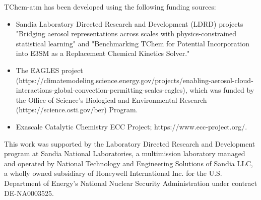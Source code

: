 TChem-atm has been developed using the following funding sources:

\begin{itemize}

\item Sandia Laboratory Directed Research and Development (LDRD) projects "Bridging aerosol representations across scales with physics-constrained statistical learning" and "Benchmarking TChem for Potential Incorporation into E3SM as a Replacement Chemical Kinetics Solver."

\item The EAGLES project (https://climatemodeling.science.energy.gov/projects/enabling-aerosol-cloud-interactions-global-convection-permitting-scales-eagles), which was funded by
the Office of Science's Biological and Environmental
Research (https://science.osti.gov/ber) Program.

\item Exascale Catalytic Chemistry ECC Project; https://www.ecc-project.org/.

\end{itemize}


This work was supported by the Laboratory Directed Research and Development program at
Sandia National Laboratories, a multimission laboratory managed and operated by National
Technology and Engineering Solutions of Sandia LLC, a wholly owned subsidiary of Honeywell
International Inc. for the U.S. Department of Energy’s National Nuclear Security Administration
under contract DE-NA0003525.
